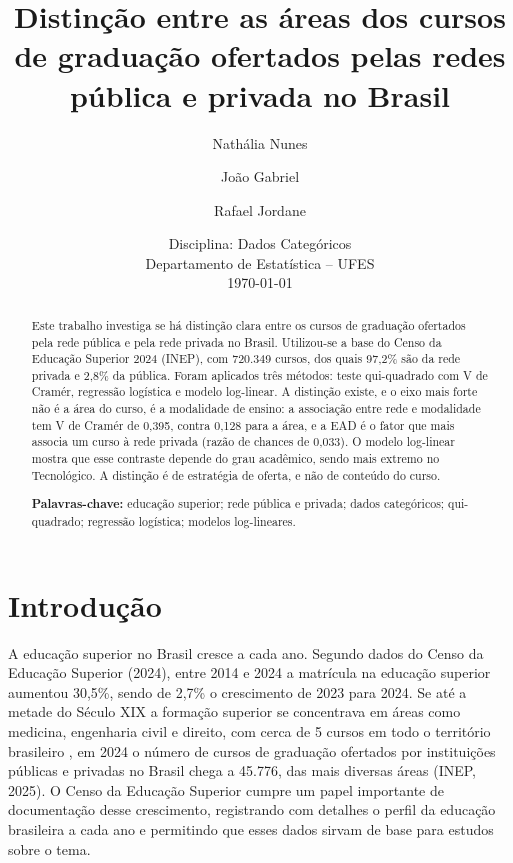 \documentclass[12pt]{article}
\title{Distinção entre as áreas dos cursos de graduação ofertados pelas redes pública e privada no Brasil}
\author{Nathália Nunes \and João Gabriel \and Rafael Jordane}
\date{Disciplina: Dados Categóricos \\ Departamento de Estatística -- UFES \\ \today}
\begin{document}
\maketitle

\begin{abstract}
\noindent Este trabalho investiga se há distinção clara entre os cursos de graduação ofertados pela rede pública e pela rede privada no Brasil. Utilizou-se a base do Censo da Educação Superior 2024 (INEP), com 720.349 cursos, dos quais 97,2\% são da rede privada e 2,8\% da pública. Foram aplicados três métodos: teste qui-quadrado com V de Cramér, regressão logística e modelo log-linear. A distinção existe, e o eixo mais forte não é a área do curso, é a modalidade de ensino: a associação entre rede e modalidade tem V de Cramér de 0,395, contra 0,128 para a área, e a EAD é o fator que mais associa um curso à rede privada (razão de chances de 0,033). O modelo log-linear mostra que esse contraste depende do grau acadêmico, sendo mais extremo no Tecnológico. A distinção é de estratégia de oferta, e não de conteúdo do curso.

\vspace{1em}
\noindent\textbf{Palavras-chave:} educação superior; rede pública e privada; dados categóricos; qui-quadrado; regressão logística; modelos log-lineares.
\end{abstract}

\section{Introdução}
A educação superior no Brasil cresce a cada ano. Segundo dados do Censo da Educação Superior (2024), entre 2014 e 2024 a matrícula na educação superior aumentou 30,5\%, sendo de 2,7\% o crescimento de 2023 para 2024. Se até a metade do Século XIX a formação superior se concentrava em áreas como medicina, engenharia civil e direito, com cerca de 5 cursos em todo o território brasileiro \parencite{cunhaUniversidadeTemporaEnsino2007}, em 2024 o número de cursos de graduação ofertados por instituições públicas e privadas no Brasil chega a 45.776, das mais diversas áreas (INEP, 2025). O Censo da Educação Superior cumpre um papel importante de documentação desse crescimento, registrando com detalhes o perfil da educação brasileira a cada ano e permitindo que esses dados sirvam de base para estudos sobre o tema.
\end{document}
